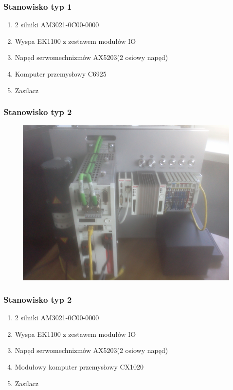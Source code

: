 \documentclass[ucs]{beamer}
\begin{document}
\begin{frame}
\frametitle{Stanowisko typ 1}
\begin{enumerate}
    \item 2 silniki AM3021-0C00-0000
    \item Wyspa EK1100 z zestawem modułów IO
    \item Napęd serwomechnizmów AX5203(2 osiowy napęd)
    \item Komputer przemysłowy C6925
    \item Zasilacz
\end{enumerate}
\end{frame}

\begin{frame}
\frametitle{Stanowisko typ 2}
\begin{figure}[!htb]	
\centering 	          
\includegraphics[height=0.8\textheight]{images/typ2.jpg}
\end{figure}
\end{frame}

\begin{frame}
\frametitle{Stanowisko typ 2}
\begin{enumerate}
    \item 2 silniki AM3021-0C00-0000
    \item Wyspa EK1100 z zestawem modułów IO
    \item Napęd serwomechnizmów AX5203(2 osiowy napęd)
    \item Modułowy komputer przemysłowy CX1020
    \item Zasilacz
\end{enumerate}
\end{frame}
\end{document}
